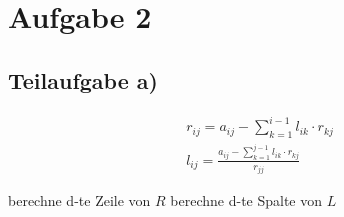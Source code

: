 \section*{Aufgabe 2}
\subsection*{Teilaufgabe a)}
\begin{align}
	r_{ij} = a_{ij} - \sum_{k=1}^{i-1} l_{ik} \cdot r_{kj} \\ %
	l_{ij} = \frac{a_{ij} - \sum_{k=1}^{j-1} l_{ik} \cdot r_{kj}}{r_{jj}}
\end{align}


\begin{algorithm}
    \begin{algorithmic}
    		\State berechne d-te Zeile von $R$
    		\State berechne d-te Spalte von $L$
	\EndFor
    \end{algorithmic}
\end{algorithm}

